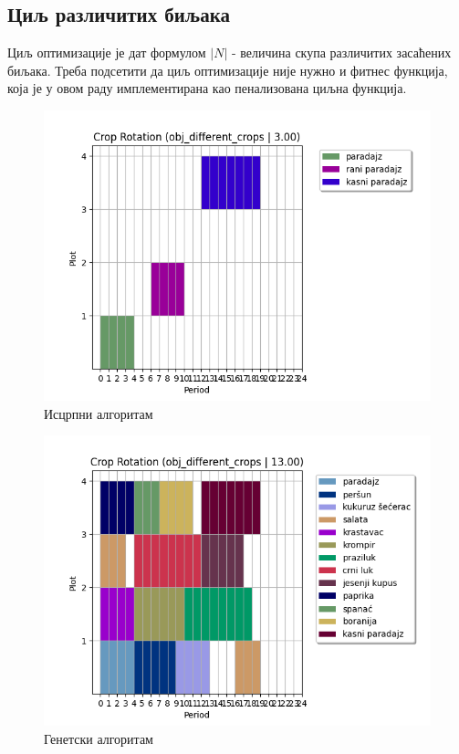 \documentclass[12pt,fleqn]{article}
\begin{document}
\subsection{Циљ различитих биљака}
Циљ оптимизације је дат формулом $|N|$ - величина скупа различитих засаћених биљака. Треба подсетити да циљ оптимизације није нужно и фитнес функција, која је у овом раду имплементирана као пенализована циљна функција.

\begin{figure}[H]
  \caption{Исцрпни алгоритам}
  \includegraphics[scale=1]{obj_different_crops_bf}\centering
\end{figure}

\begin{figure}[H]
  \caption{Генетски алгоритам}
  \includegraphics[scale=1]{obj_different_crops_ga}\centering
\end{figure}
\end{document}
